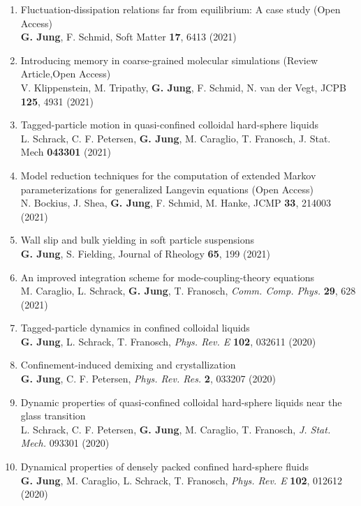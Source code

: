 \begin{enumerate}
					\item  Fluctuation-dissipation relations far from equilibrium: A case study (Open Access)\\
	\textbf{G. Jung}, F. Schmid, Soft Matter \textbf{17}, 6413 (2021)
				\item  Introducing memory in coarse-grained molecular simulations (Review Article,Open Access)\\
	V. Klippenstein, M. Tripathy, \textbf{G. Jung}, F. Schmid, N. van der Vegt, JCPB \textbf{125}, 4931 (2021)
			\item  Tagged-particle motion in quasi-confined colloidal hard-sphere liquids\\
	L. Schrack, C. F. Petersen, \textbf{G. Jung}, M. Caraglio, T. Franosch, J. Stat. Mech \textbf{043301} (2021)
			\item  Model reduction techniques for the computation of extended Markov parameterizations for generalized Langevin equations (Open Access)\\
	 N. Bockius, J. Shea, \textbf{G. Jung}, F. Schmid, M. Hanke, JCMP \textbf{33}, 214003 (2021) 
		\item Wall slip and bulk yielding in soft particle suspensions\\
	\textbf{G. Jung}, S. Fielding, Journal of Rheology \textbf{65}, 199 (2021)
		\item An improved integration scheme for mode-coupling-theory equations\\
	M. Caraglio, L. Schrack, \textbf{G. Jung}, T. Franosch, \emph{Comm. Comp. Phys.} \textbf{29}, 628 (2021)
		\item Tagged-particle dynamics in confined colloidal liquids\\
	\textbf{G. Jung}, L. Schrack, T. Franosch, \emph{Phys. Rev. E} \textbf{102}, 032611 (2020)
	\item Confinement-induced demixing and crystallization\\
	\textbf{G. Jung}, C. F. Petersen, \emph{Phys. Rev. Res.} \textbf{2}, 033207 (2020)
		\item Dynamic properties of quasi-confined colloidal hard-sphere liquids near the glass transition\\
	L. Schrack, C. F. Petersen, \textbf{G. Jung}, M. Caraglio, T. Franosch, \emph{J. Stat. Mech.} 093301 (2020) 
	\item Dynamical properties of densely packed confined hard-sphere fluids\\
	\textbf{G. Jung}, M. Caraglio, L. Schrack, T. Franosch, \emph{Phys. Rev. E} \textbf{102}, 012612 (2020)

\end{enumerate}
